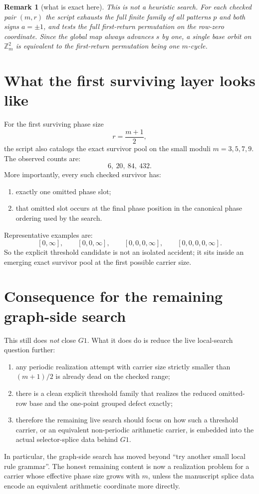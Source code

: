 \documentclass[11pt]{article}
\newtheorem{remark}[theorem]{Remark}
\begin{document}
\begin{remark}[what is exact here]
This is not a heuristic search.
For each checked pair $(m,r)$ the script exhausts the full finite family of all
patterns $p$ and both signs $a=\pm1$, and tests the full first-return
permutation on the row-zero coordinate.
Since the global map always advances $s$ by one, a single base orbit on
$\mathbb Z_m^2$ is equivalent to the first-return permutation being one
$m$-cycle.
\end{remark}

\section{What the first surviving layer looks like}
For the first surviving phase size
\[
 r=\frac{m+1}{2},
\]
the script also catalogs the exact survivor pool on the small moduli
$m=3,5,7,9$.
The observed counts are:
\[
6,\ 20,\ 84,\ 432.
\]
More importantly, every such checked survivor has:
\begin{enumerate}[label=\textup{(\arabic*)},leftmargin=2.8em]
\item exactly one omitted phase slot;
\item that omitted slot occurs at the final phase position in the canonical
      phase ordering used by the search.
\end{enumerate}
Representative examples are:
\[
[0,\infty],
\qquad
[0,0,\infty],
\qquad
[0,0,0,\infty],
\qquad
[0,0,0,0,\infty].
\]
So the explicit threshold candidate is not an isolated accident; it sits inside
an emerging exact survivor pool at the first possible carrier size.

\section{Consequence for the remaining graph-side search}
This still does \emph{not} close $G1$.
What it does do is reduce the live local-search question further:
\begin{enumerate}[label=\textup{(\arabic*)},leftmargin=2.8em]
\item any periodic realization attempt with carrier size strictly smaller than
      $(m+1)/2$ is already dead on the checked range;
\item there is a clean explicit threshold family that realizes the reduced
      omitted-row base and the one-point grouped defect exactly;
\item therefore the remaining live search should focus on how such a threshold
      carrier, or an equivalent non-periodic arithmetic carrier, is embedded
      into the actual selector-splice data behind $G1$.
\end{enumerate}
In particular, the graph-side search has moved beyond ``try another small local
rule grammar''. The honest remaining content is now a realization problem for a
carrier whose effective phase size grows with $m$, unless the manuscript splice
data encode an equivalent arithmetic coordinate more directly.
\end{document}
